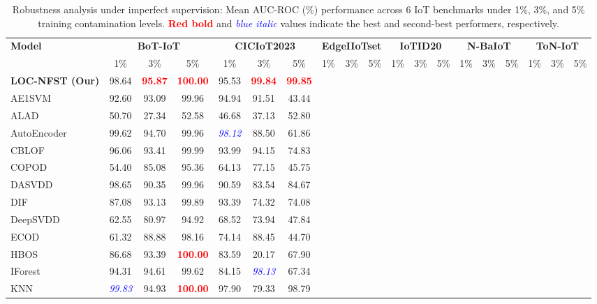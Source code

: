 \begin{table}
\caption{Robustness analysis under imperfect supervision: Mean AUC-ROC (\%) performance across 6 IoT benchmarks under 1\%, 3\%, and 5\% training contamination levels. \textcolor{red}{\textbf{Red bold}} and \textcolor{blue}{\textit{blue italic}} values indicate the best and second-best performers, respectively.}
\centering
\small
\setlength{\tabcolsep}{3.5pt}
\begin{tabular}{l ccc ccc ccc ccc ccc ccc}
\toprule
\multirow{2.5}{*}{\textbf{Model}} & \multicolumn{3}{c}{\textbf{BoT-IoT}} & \multicolumn{3}{c}{\textbf{CICIoT2023}} & \multicolumn{3}{c}{\textbf{EdgeIIoTset}} & \multicolumn{3}{c}{\textbf{IoTID20}} & \multicolumn{3}{c}{\textbf{N-BaIoT}} & \multicolumn{3}{c}{\textbf{ToN-IoT}} \\
\cmidrule(lr){2-4} \cmidrule(lr){5-7} \cmidrule(lr){8-10} \cmidrule(lr){11-13} \cmidrule(lr){14-16} \cmidrule(lr){17-19}
 & 1\% & 3\% & 5\% & 1\% & 3\% & 5\% & 1\% & 3\% & 5\% & 1\% & 3\% & 5\% & 1\% & 3\% & 5\% & 1\% & 3\% & 5\% \\
\midrule
\textbf{LOC-NFST (Our)} & 98.64 & \textcolor{red}{\textbf{95.87}} & \textcolor{red}{\textbf{100.00}} & 95.53 & \textcolor{red}{\textbf{99.84}} & \textcolor{red}{\textbf{99.85}} \\
AE1SVM & 92.60 & 93.09 & 99.96 & 94.94 & 91.51 & 43.44 \\
ALAD & 50.70 & 27.34 & 52.58 & 46.68 & 37.13 & 52.80 \\
AutoEncoder & 99.62 & 94.70 & 99.96 & \textcolor{blue}{\textit{98.12}} & 88.50 & 61.86 \\
CBLOF & 96.06 & 93.41 & 99.99 & 93.99 & 94.15 & 74.83 \\
COPOD & 54.40 & 85.08 & 95.36 & 64.13 & 77.15 & 45.75 \\
DASVDD & 98.65 & 90.35 & 99.96 & 90.59 & 83.54 & 84.67 \\
DIF & 87.08 & 93.13 & 99.89 & 93.39 & 74.32 & 74.08 \\
DeepSVDD & 62.55 & 80.97 & 94.92 & 68.52 & 73.94 & 47.84 \\
ECOD & 61.32 & 88.88 & 98.16 & 74.14 & 88.45 & 44.70 \\
HBOS & 86.68 & 93.39 & \textcolor{red}{\textbf{100.00}} & 83.59 & 20.17 & 67.90 \\
IForest & 94.31 & 94.61 & 99.62 & 84.15 & \textcolor{blue}{\textit{98.13}} & 67.34 \\
KNN & \textcolor{blue}{\textit{99.83}} & 94.93 & \textcolor{red}{\textbf{100.00}} & 97.90 & 79.33 & 98.79 \\

\end{tabular}
\end{table}
